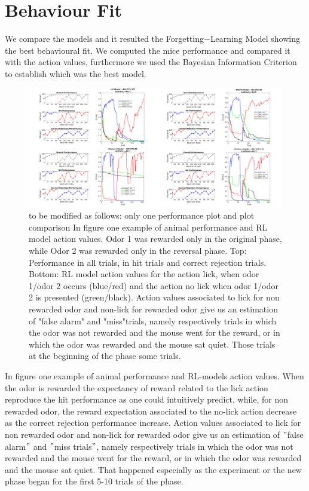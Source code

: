\section{Behaviour Fit}
\label{sec:Behavior}
We compare the models and it resulted the Forgetting$-$Learning Model showing the best behavioural fit. We computed the mice performance and compared it with the action values, furthermore we used the Bayesian Information Criterion to establish which was the best model.\\

\begin{figure}[ht!]
    \includegraphics[scale=0.3]{figures/ResumeRLPerf.png}
    \caption{{\color{red} to be modified as follows: only one performance plot and plot comparison} In figure one example of animal performance and RL model action values.
    Odor 1 was rewarded only in the original phase, while Odor 2 was rewarded only in the reversal phase. Top: Performance in all trials, in hit trials and correct rejection trials. Bottom: RL model action values for the action lick, when odor 1/odor 2 occurs (blue/red) and the action no lick when odor 1/odor 2 is presented (green/black). Action values associated to lick for non rewarded odor and non-lick for rewarded odor give us an estimation of "false alarm" and "miss"trials, namely respectively trials in which the odor was not rewarded and the mouse went for the reward, or in which the odor was rewarded and the mouse sat quiet. Those trials at the beginning of the phase some trials.
    }
    \label{fig:PerfRL}
\end{figure}
In figure one example of animal performance and RL-models action values. When the odor is rewarded the expectancy of reward related to the lick action reproduce the hit performance as one could intuitively predict, while, for non rewarded odor, the reward expectation associated to the no-lick action decrease as the correct rejection performance increase. Action values associated to lick for non rewarded odor and non-lick for rewarded odor give us an estimation of $"$false alarm$"$ and $"$miss trials$"$, namely respectively trials in which the odor was not rewarded and the mouse went for the reward, or in which the odor was rewarded and the mouse sat quiet. That happened especially as the experiment or the new phase began for the first 5-10 trials of the phase.\\
